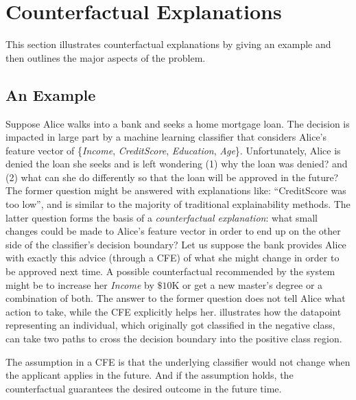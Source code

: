 \section{Counterfactual Explanations}
This section illustrates counterfactual explanations by giving an example and then outlines the major aspects of the problem. 

\subsection{An Example}
Suppose Alice walks into a bank and seeks a home mortgage loan. The decision is impacted in large part by a machine learning classifier that considers Alice's feature vector of \{\emph{Income}, \emph{CreditScore}, \emph{Education}, \emph{Age}\}. Unfortunately, Alice is denied the loan she seeks and is left wondering (1) why the loan was denied? and (2) what can she do differently so that the loan will be approved in the future? The former question might be answered with explanations like: ``CreditScore was too low'', and is similar to the majority of traditional explainability methods. The latter question forms the basis of a \emph{counterfactual explanation}: what small changes could be made to Alice's feature vector in order to end up on the other side of the classifier's decision boundary? Let us suppose the bank provides Alice with exactly this advice (through a CFE) of what she might change in order to be approved next time. 
A possible counterfactual recommended by the system might be to increase her \emph{Income} by $\$10$K or get a new master's degree or a combination of both. The answer to the former question does not tell Alice what action to take, while the CFE explicitly helps her. 
 illustrates how the datapoint representing an individual, which originally got classified in the negative class, can take two paths to cross the decision boundary into the positive class region. 

The assumption in a CFE is that the underlying classifier would not change when the applicant applies in the future. And if the assumption holds, the counterfactual guarantees the desired outcome in the future time. 

